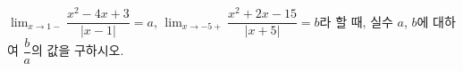 $\displaystyle\lim_{x\to 1-}\dfrac{x^2-4x+3}{|x-1|}=a$, $\displaystyle\lim_{x\to-5+}\dfrac{x^2+2x-15}{|x+5|}=b$라 할 때, 실수 $a$, $b$에 대하여 $\dfrac{b}{a}$의 값을 구하시오.
